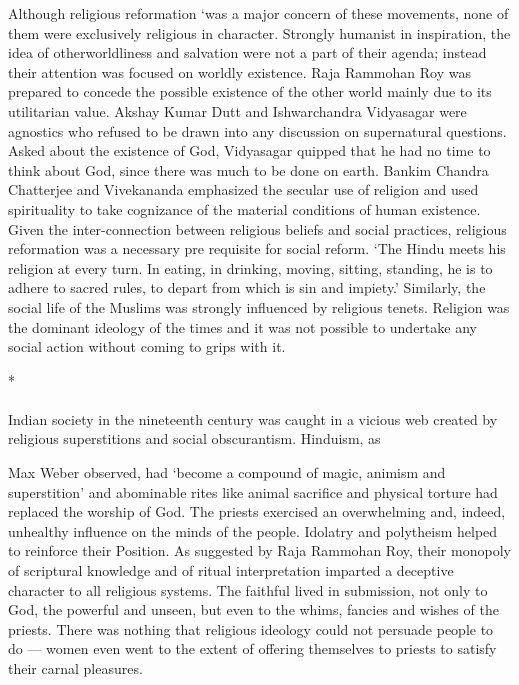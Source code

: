 Although religious reformation `was a major concern of these movements, none of them were exclusively religious in character. Strongly humanist in inspiration, the idea of otherworldliness and salvation were not a part of their agenda; instead their attention was focused on worldly existence. Raja Rammohan Roy was prepared to concede the possible existence of the other world mainly due to its utilitarian value. Akshay Kumar Dutt and Ishwarchandra Vidyasagar were agnostics who refused to be drawn into any discussion on supernatural questions. Asked about the existence of God, Vidyasagar quipped that he had no time to think about God, since there was much to be done on earth. Bankim Chandra Chatterjee and Vivekananda emphasized the secular use of religion and used spirituality to take cognizance of the material conditions of human existence. Given the inter-connection between religious beliefs and social practices, religious reformation was a necessary pre­ requisite for social reform. `The Hindu meets his religion at every turn. In eating, in drinking, moving, sitting, standing, he is to adhere to sacred rules, to depart from which is sin and impiety.' Similarly, the social life of the Muslims was strongly influenced by religious tenets. Religion was the dominant ideology of the times and it was not possible to undertake any social action without coming to grips with it.

\begin{center}*\end{center}

\paragraph*{}


Indian society in the nineteenth century was caught in a vicious web created by religious superstitions and social obscurantism. Hinduism, as

Max Weber observed, had `become a compound of magic, animism and superstition' and abominable rites like animal sacrifice and physical torture had replaced the worship of God. The priests exercised an overwhelming and, indeed, unhealthy influence on the minds of the people. Idolatry and polytheism helped to reinforce their Position. As suggested by Raja Rammohan Roy, their monopoly of scriptural knowledge and of ritual interpretation imparted a deceptive character to all religious systems. The faithful lived in submission, not only to God, the powerful and unseen, but even to the whims, fancies and wishes of the priests. There was nothing that religious ideology could not persuade people to do — women even went to the extent of offering themselves to priests to satisfy their carnal pleasures.

